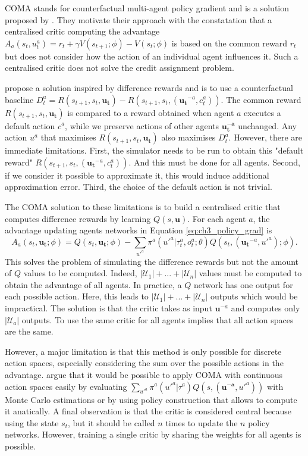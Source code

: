 COMA stands for counterfactual multi-agent policy gradient and is a solution proposed by \cite{foerster2017coma}.
They motivate their approach with the constatation that a centralised critic computing the advantage $A_a(s_t, u^a_t) = r_t + \gamma V(s_{t+1}; \phi) - V(s_t; \phi)$ is based on the common reward $r_t$ but does not consider how the action of an individual agent influences it.
Such a centralised critic does not solve the credit assignment problem.

\cite{foerster2017coma} propose a solution inspired by difference rewards \citep{wolpert2001optimal} and is to use a counterfactual baseline $D_t^a=R(s_{t+1}, s_t, \mathbf {u_t}) - R(s_{t+1}, s_t, (\mathbf{u_t}^{-a}, c_t^a))$.
The common reward $R(s_{t+1}, s_t, \mathbf {u_t})$ is compared to a reward obtained when agent $a$ executes a default action $c^a$, while we preserve actions of other agents $\mathbf{u_t^{-a}}$ unchanged.
Any action $u^a$ that maximises $R(s_{t+1}, s_t, \mathbf {u_t})$ also maximises $D_t^a$.
However, there are immediate limitations.
First, the simulator needs to be run to obtain this "default reward" $R(s_{t+1}, s_t, (\mathbf{u_t}^{-a}, c_t^a))$.
And this must be done for all agents.
Second, if we consider it possible to approximate it, this would induce additional approximation error.
Third, the choice of the default action is not trivial.

The COMA solution to these limitations is to build a centralised critic that computes difference rewards by learning $Q(s, \mathbf{u})$.
For each agent $a$, the advantage updating agents networks in Equation \ref{eq:ch3_policy_grad} is 
\begin{equation}
\label{eq:ch3_coma_adv}
A_a(s_t,\mathbf{u_t}; \phi)=Q(s_t, \mathbf{u_t};\phi) - \sum_{u'^{a}} \pi^a({u'^{a}} |\tau_t^a, o_t^a;\theta) Q(s_t, (\mathbf{u_t}^{-a}, u'^{a}); \phi).
\end{equation}
This solves the problem of simulating the difference rewards but not the amount of $Q$ values to be computed.
Indeed, $|\mathcal{U}_1|+...+|\mathcal{U}_n|$ values must be computed to obtain the advantage of all agents.
In practice, a $Q$ network has one output for each possible action.
Here, this leads to $|\mathcal{U}_1|+...+|\mathcal{U}_n|$ outputs which would be impractical.
The solution is that the critic takes as input $\mathbf{u}^{-a}$ and computes only $|\mathcal{U}_a|$ outputs.
To use the same critic for all agents implies that all action spaces are the same.

However, a major limitation is that this method is only possible for discrete action spaces, especially considering the sum over the possible actions in the advantage.
\cite{foerster2017coma} argue that it would be possible to apply COMA with continuous action spaces easily by evaluating $\sum_{u'^{a}} \pi^a(u'^{a}|\tau^a) Q(s,(\mathbf{u^{-a}},u'^{a}))$ with Monte Carlo estimations or by using policy construction that allows to compute it anatically.
A final observation is that the critic is considered central because using the state $s_t$, but it should be called $n$ times to update the $n$ policy networks.
However, training a single critic by sharing the weights for all agents is possible.

